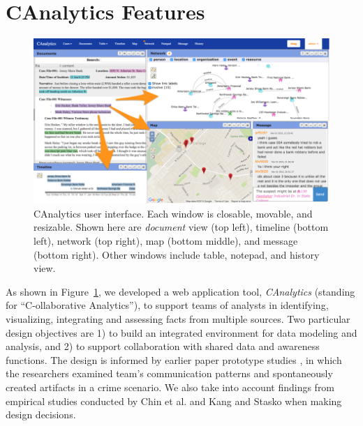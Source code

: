 \section{CAnalytics Features}\label{canalytics-features}


\begin{figure}
	\centering
	\includegraphics[width=\columnwidth]{./img/interface.png}
	\caption{CAnalytics user interface. Each window is closable, movable, and resizable. Shown here are \emph{document} view (top left), timeline (bottom left), network (top right), map (bottom middle), and message (bottom right). Other windows include table, notepad, and history view. }\label{fig:canalytics}
\end{figure}


As shown in Figure~\ref{fig:canalytics}, we developed a web application tool, \emph{CAnalytics} (standing for ``C-ollaborative Analytics''), to
support teams of analysts in identifying, visualizing, integrating and
assessing facts from multiple sources. Two particular design objectives are 1) to build an integrated environment for data modeling and analysis, and 2) to support collaboration with shared data and awareness functions. The design is informed by earlier
paper prototype studies \cite{Borge2012, Carroll2013}, in which the researchers examined team's communication patterns and
spontaneously created artifacts in a crime scenario. We also take into account findings from
empirical studies conducted by Chin et al. \cite{Chin2009} and Kang
and Stasko \cite{Kang2011} when making design decisions.

